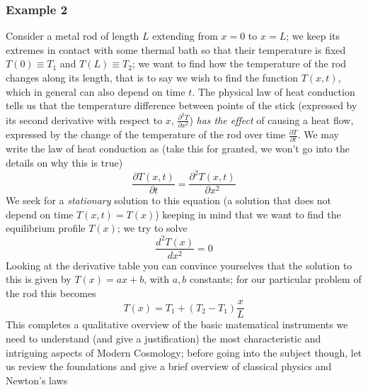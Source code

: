 \documentclass[11pt, a4paper,oneside,openright]{book}
\numberwithin{equation}{section}
\begin{document}
\subsubsection{Example 2}
Consider a metal rod of length $L$ extending from $x=0$ to $x=L$; we keep its extremes in contact with some thermal bath so that their temperature is fixed $T(0)\equiv T_1$ and $T(L)\equiv T_2$; we want to find how the temperature of the rod changes along its length, that is to say we wish to find the function $T(x,t)$, which in general can also depend on time $t$. The physical law of heat conduction tells us that the temperature difference between points of the stick (expressed by its second derivative with respect to $x$, $\frac{\partial^2 T}{\partial x^2}$) \textit{has the effect} of causing a heat flow, expressed by the change of the temperature of the rod over time $\frac{\partial T}{\partial t}$. We may write the law of heat conduction as (take this for granted, we won't go into the details on why this is true)
\begin{equation}
\frac{\partial T(x,t)}{\partial t}=\frac{\partial^2 T(x,t)}{\partial x^2}
\end{equation} 
We seek for a \textit{stationary} solution to this equation (a solution that does not depend on time $T(x,t)=T(x)$) keeping in mind that we want to find the equilibrium profile $T(x)$; we try to solve 
\begin{equation}
\frac{d^2T(x)}{dx^2}=0
\end{equation}
Looking at the derivative table you can convince yourselves that the solution to this is given by $T(x)=ax+b$, with $a,b$ constants; for our particular problem of the rod this becomes 
\begin{equation}
T(x)=T_1+(T_2-T_1)\frac{x}{L}
\end{equation}
This completes a qualitative overview of the basic matematical instruments we need to understand (and give a justification) the most characteristic and intriguing aspects of Modern Cosmology; before going into the subject though, let us review the foundations and give a brief overview of classical physics and Newton's laws 
\end{document}
